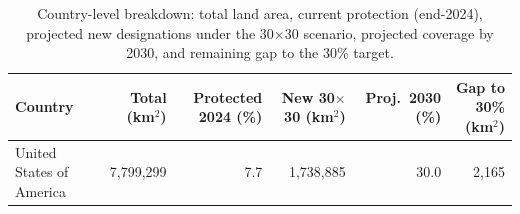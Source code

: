 \begin{table}[htbp]
  \centering
  \small
  \caption{Country-level breakdown: total land area, current protection (end-2024), projected new designations under the 30$\times$30 scenario, projected coverage by 2030, and remaining gap to the 30\% target.}
  \label{tab:forward_country}
  \begin{tabular}{lrrrrr}
    \toprule
    Country & Total (km$^2$) & Protected 2024 (\%) & New 30$\times$30 (km$^2$) & Proj.\ 2030 (\%) & Gap to 30\% (km$^2$) \\
    \midrule
    United States of America & 7,799,299 & 7.7 & 1,738,885 & 30.0 & 2,165 \\
    \bottomrule
  \end{tabular}
\end{table}
